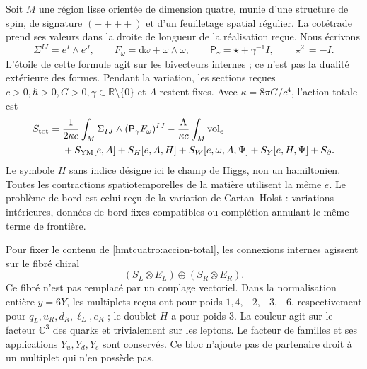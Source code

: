 Soit \(M\) une région lisse orientée de dimension quatre, munie d’une structure de spin, de signature \((-+++)\) et d’un feuilletage spatial régulier. La cotétrade prend ses valeurs dans la droite de longueur de la réalisation reçue. Nous écrivons
\[
 \Sigma^{IJ}=e^I\wedge e^J,\qquad
 F_\omega=\mathrm d\omega+\omega\wedge\omega,\qquad
 \mathsf P_\gamma=\star+\gamma^{-1}I,\qquad \star^2=-I.
\]
L’étoile de cette formule agit sur les bivecteurs internes ; ce n’est pas la dualité extérieure des formes. Pendant la variation, les sections reçues \(c>0,\hbar>0,G>0,\gamma\in\mathbb R\setminus\{0\}\) et \(\Lambda\) restent fixes. Avec \(\kappa=8\pi G/c^4\), l’action totale est
\begin{equation}
 \begin{split}
 S_{\rm tot}={}&\frac1{2\kappa c}
   \int_M\Sigma_{IJ}\wedge(\mathsf P_\gamma F_\omega)^{IJ}
 -\frac{\Lambda}{\kappa c}\int_M\operatorname{vol}_e\\
 &+S_{\rm YM}[e,A]+S_H[e,A,H]
   +S_W[e,\omega,A,\Psi]+S_Y[e,H,\Psi]+S_{\partial}.
 \end{split}
 \label{hmtcuatro:accion-total}
\end{equation}
Le symbole \(H\) sans indice désigne ici le champ de Higgs, non un hamiltonien. Toutes les contractions spatiotemporelles de la matière utilisent la même \(e\). Le problème de bord est celui reçu de la variation de Cartan--Holst : variations intérieures, données de bord fixes compatibles ou complétion annulant le même terme de frontière.

Pour fixer le contenu de \eqref{hmtcuatro:accion-total}, les connexions internes agissent sur le fibré chiral
\[
 (S_L\otimes E_L)\oplus(S_R\otimes E_R).
\]
Ce fibré n’est pas remplacé par un couplage vectoriel. Dans la normalisation entière \(y=6Y\), les multiplets reçus ont pour poids \(1,4,-2,-3,-6\), respectivement pour \(q_L,u_R,d_R,\ell_L,e_R\) ; le doublet \(H\) a pour poids \(3\). La couleur agit sur le facteur \(\mathbb C^3\) des quarks et trivialement sur les leptons. Le facteur de familles et ses applications \(Y_u,Y_d,Y_e\) sont conservés. Ce bloc n’ajoute pas de partenaire droit à un multiplet qui n’en possède pas.

